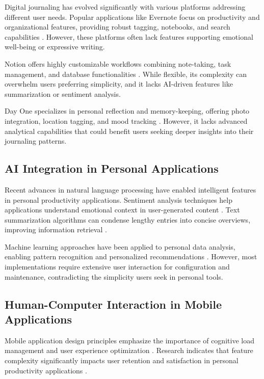 \documentclass[conference]{IEEEtran}
\begin{document}
{\begin{IEEEkeywords}
Digital journaling has evolved significantly with various platforms addressing different user needs. Popular applications like Evernote focus on productivity and organizational features, providing robust tagging, notebooks, and search capabilities \cite{evernote2023features}. However, these platforms often lack features supporting emotional well-being or expressive writing.

Notion offers highly customizable workflows combining note-taking, task management, and database functionalities \cite{notion2023platform}. While flexible, its complexity can overwhelm users preferring simplicity, and it lacks AI-driven features like summarization or sentiment analysis.

Day One specializes in personal reflection and memory-keeping, offering photo integration, location tagging, and mood tracking \cite{dayone2023features}. However, it lacks advanced analytical capabilities that could benefit users seeking deeper insights into their journaling patterns.

\subsection{AI Integration in Personal Applications}

Recent advances in natural language processing have enabled intelligent features in personal productivity applications. Sentiment analysis techniques help applications understand emotional context in user-generated content \cite{liu2012sentiment}. Text summarization algorithms can condense lengthy entries into concise overviews, improving information retrieval \cite{allahyari2017text}.

Machine learning approaches have been applied to personal data analysis, enabling pattern recognition and personalized recommendations \cite{chen2019personalized}. However, most implementations require extensive user interaction for configuration and maintenance, contradicting the simplicity users seek in personal tools.

\subsection{Human-Computer Interaction in Mobile Applications}

Mobile application design principles emphasize the importance of cognitive load management and user experience optimization \cite{norman2013design}. Research indicates that feature complexity significantly impacts user retention and satisfaction in personal productivity applications \cite{kjeldskov2003review}.


\end{IEEEkeywords}}
\end{document}
